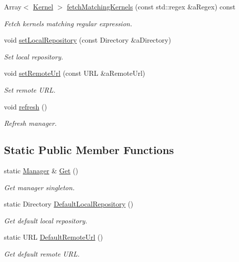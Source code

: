 \begin{DoxyCompactItemize}
Array$<$ \hyperlink{classostk_1_1physics_1_1env_1_1ephem_1_1spice_1_1_kernel}{Kernel} $>$ \hyperlink{classostk_1_1physics_1_1env_1_1ephem_1_1spice_1_1_manager_a5a539eb56558f1a0d6dfe1389760459f}{fetch\+Matching\+Kernels} (const std\+::regex \&a\+Regex) const
\begin{DoxyCompactList}\small\item\em Fetch kernels matching regular expression. \end{DoxyCompactList}\item 
void \hyperlink{classostk_1_1physics_1_1env_1_1ephem_1_1spice_1_1_manager_a6a3b6a49dfc44fc7f5545e55e8ef4e19}{set\+Local\+Repository} (const Directory \&a\+Directory)
\begin{DoxyCompactList}\small\item\em Set local repository. \end{DoxyCompactList}\item 
void \hyperlink{classostk_1_1physics_1_1env_1_1ephem_1_1spice_1_1_manager_aa5a020cb2245b5583086bb788428f5a6}{set\+Remote\+Url} (const U\+RL \&a\+Remote\+Url)
\begin{DoxyCompactList}\small\item\em Set remote U\+RL. \end{DoxyCompactList}\item 
void \hyperlink{classostk_1_1physics_1_1env_1_1ephem_1_1spice_1_1_manager_ac8163df1e48cc4aa3cb21821e98d89f3}{refresh} ()
\begin{DoxyCompactList}\small\item\em Refresh manager. \end{DoxyCompactList}\end{DoxyCompactItemize}
\subsection*{Static Public Member Functions}
\begin{DoxyCompactItemize}
\item 
static \hyperlink{classostk_1_1physics_1_1env_1_1ephem_1_1spice_1_1_manager}{Manager} \& \hyperlink{classostk_1_1physics_1_1env_1_1ephem_1_1spice_1_1_manager_a9662ac46fe23c562941b4ade980f30dd}{Get} ()
\begin{DoxyCompactList}\small\item\em Get manager singleton. \end{DoxyCompactList}\item 
static Directory \hyperlink{classostk_1_1physics_1_1env_1_1ephem_1_1spice_1_1_manager_ada263e74ec723c920f6a81ffb1fde181}{Default\+Local\+Repository} ()
\begin{DoxyCompactList}\small\item\em Get default local repository. \end{DoxyCompactList}\item 
static U\+RL \hyperlink{classostk_1_1physics_1_1env_1_1ephem_1_1spice_1_1_manager_a7e30532e70e5e8fbbafc2e1dcdc411a8}{Default\+Remote\+Url} ()
\begin{DoxyCompactList}\small\item\em Get default remote U\+RL. \end{DoxyCompactList}\end{DoxyCompactItemize}


